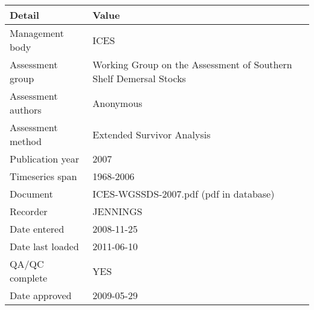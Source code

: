 \begin{table}[htb]
\centering
\begin{tabular}{lp{7cm}}
\toprule
Detail & Value \\
\midrule
Management body    & ICES                                                              \\
Assessment group   & Working Group on the Assessment of Southern Shelf Demersal Stocks \\
Assessment authors & Anonymous                                                         \\
Assessment method  & Extended Survivor Analysis                                        \\
Publication year   & 2007                                                              \\
Timeseries span    & 1968-2006                                                         \\
Document           & ICES-WGSSDS-2007.pdf (pdf in database)                            \\
Recorder           & JENNINGS                                                          \\
Date entered       & 2008-11-25                                                        \\
Date last loaded   & 2011-06-10                                                        \\
QA/QC complete     & YES                                                               \\
Date approved      & 2009-05-29                                                        \\
\bottomrule
\end{tabular}
\label{tab:assessdet}
\end{table}
